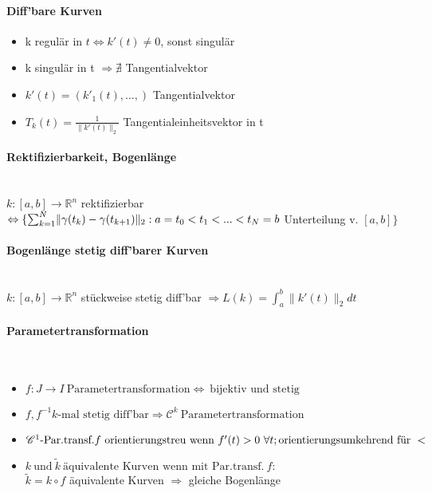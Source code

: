 \documentclass[paper=a3,paper=landscape, fontsize=9pt,DIV=30]{scrartcl}
\newcommand{\real}{{\mathbb{R}}}
\begin{document}
\begin{multicols*}{4}
  \paragraph{Diff'bare Kurven}
  \begin{itemize}
  \item k regulär in $t \Leftrightarrow k'(t) \neq 0$, sonst singulär
  \item k singulär in t $\Rightarrow \nexists$ Tangentialvektor
  \item $k'(t)=(k'_1(t),...,)$ Tangentialvektor
  \item $T_k(t)=\frac{1}{\lVert k'(t)\rVert_2}$ Tangentialeinheitsvektor in t
  \end{itemize}


  \paragraph{Rektifizierbarkeit, Bogenlänge}\hspace{0pt} \\
  $k:[a,b]\rightarrow \real^n$ rektifizierbar $\Leftrightarrow \{\sum_{k=1}^{N}\lVert\gamma(t_k)-\gamma(t_{k+1})\rVert_2:\\
  a = t_0 < t_1 < ... < t_N = b$ Unterteilung v. $[a,b]\}$


  \paragraph{Bogenlänge stetig diff'barer Kurven}\hspace{0pt} \\
  $k: [a,b]\rightarrow \real^n$ stückweise stetig diff'bar $\Rightarrow L(k)=\int_{a}^{b}\lVert k'(t)\rVert_2 dt$

  \paragraph{Parametertransformation}\hspace{0pt} \\
  \begin{itemize}
  	\item $f: J \rightarrow I \ \text{Parametertransformation} \Leftrightarrow \ \text{bijektiv und stetig}$
  	\item $f, f^{-1} k\text{-mal stetig diff'bar} \Rightarrow \mathscr{C}^k \ \text{Parametertransformation}$
  	\item $\mathscr{C}^1 \text{-Par.transf.} f \ \text{orientierungstreu wenn} \ f'(t) > 0 \ \forall t; \\ \text{orientierungsumkehrend für} \ <$
  	\item $ k \ \text{und}\ \tilde{k} \ \text{äquivalente Kurven wenn mit Par.transf.}\ f:$\\ $\tilde{k} = k \circ f$ äquivalente Kurven $\Rightarrow$ gleiche Bogenlänge
  \end{itemize}


\end{multicols*}
\end{document}
